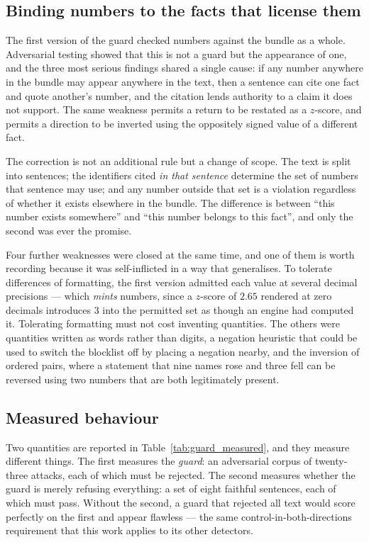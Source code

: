 \subsection{Binding numbers to the facts that license them}

The first version of the guard checked numbers against the bundle as a whole. Adversarial testing
showed that this is not a guard but the appearance of one, and the three most serious findings
shared a single cause: if any number anywhere in the bundle may appear anywhere in the text, then a
sentence can cite one fact and quote another's number, and the citation lends authority to a claim
it does not support. The same weakness permits a return to be restated as a $z$-score, and permits a
direction to be inverted using the oppositely signed value of a different fact.

The correction is not an additional rule but a change of scope. The text is split into sentences;
the identifiers cited \emph{in that sentence} determine the set of numbers that sentence may use;
and any number outside that set is a violation regardless of whether it exists elsewhere in the
bundle. The difference is between ``this number exists somewhere'' and ``this number belongs to this
fact'', and only the second was ever the promise.

Four further weaknesses were closed at the same time, and one of them is worth recording because it
was self-inflicted in a way that generalises. To tolerate differences of formatting, the first
version admitted each value at several decimal precisions --- which \emph{mints} numbers, since a
$z$-score of $2.65$ rendered at zero decimals introduces $3$ into the permitted set as though an
engine had computed it. Tolerating formatting must not cost inventing quantities. The others were
quantities written as words rather than digits, a negation heuristic that could be used to switch
the blocklist off by placing a negation nearby, and the inversion of ordered pairs, where a
statement that nine names rose and three fell can be reversed using two numbers that are both
legitimately present.

\subsection{Measured behaviour}

Two quantities are reported in Table~\ref{tab:guard_measured}, and they measure different
things. The first measures the
\emph{guard}: an adversarial corpus of twenty-three attacks, each of which must be rejected. The
second measures whether the guard is merely refusing everything: a set of eight faithful sentences,
each of which must pass. Without the second, a guard that rejected all text would score perfectly on
the first and appear flawless --- the same control-in-both-directions requirement that this work
applies to its other detectors.

